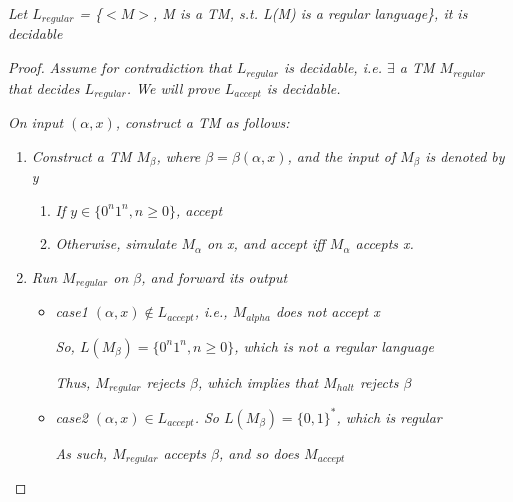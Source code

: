 \documentclass{article}
\begin{document}
\begin{thm}
    \textit{Let $L_{regular}$ = \{$<M>$, M is a TM, s.t. L(M) is a regular language\}, it is decidable}
    \begin{proof}
        \textit{Assume for contradiction that $L_{regular}$ is decidable, i.e. $\exists$ a TM $M_{regular}$ that decides $L_{regular}$. We will prove $L_{accept}$ is decidable.}

        \textit{On input $(\alpha,x)$, construct a TM as follows:}

        \begin{enumerate}
            \item \textit{Construct a TM $M_\beta$, where $\beta = \beta(\alpha,x)$, and the input of $M_\beta$ is denoted by y}
            \begin{enumerate}
                \item \textit{If $y \in \{0^n1^n,n\geq0\}$, accept}
                \item \textit{Otherwise, simulate $M_\alpha$ on x, and accept iff $M_\alpha$ accepts x.}
            \end{enumerate}
            \item \textit{Run $M_{regular}$ on $\beta$, and forward its output}
            \begin{itemize}
                \item \textit{case1 $(\alpha,x)\notin L_{accept}$, i.e., $M_{alpha}$ does not accept x}
                
                \textit{So, $L(M_\beta) = \{0^n1^n,n\geq0\}$, which is not a regular language}

                \textit{Thus, $M_{regular}$ rejects $\beta$, which implies that $M_{halt}$ rejects $\beta$}

                \item \textit{case2 $(\alpha,x)\in L_{accept}$. So $L(M_\beta) = \{0,1\}^*$, which is regular}
                
                \textit{As such, $M_{regular}$ accepts $\beta$, and so does $M_{accept}$}
            \end{itemize}
        \end{enumerate}
    \end{proof}
\end{thm}
\end{document}
